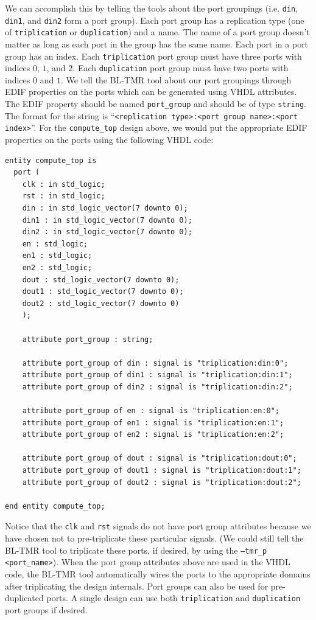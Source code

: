 We can accomplish this by telling the tools about the port groupings (i.e.
\texttt{din}, \texttt{din1}, and \texttt{din2} form a port group). Each port
group has a replication type (one of \texttt{triplication} or
\texttt{duplication}) and a name. The name of a port group doesn't matter as
long as each port in the group has the same name. Each port in a port group has
an index. Each \texttt{triplication} port group must have three ports with
indices $0$, $1$, and $2$. Each \texttt{duplication} port group must have two
ports with indices $0$ and $1$. We tell the BL-TMR tool about our port groupings
through EDIF properties on the ports which can be generated using VHDL
attributes. The EDIF property should be named \texttt{port\_group} and should
be of type \texttt{string}. The format for the string is ``\texttt{<replication
type>:<port group name>:<port index>}''. For the \texttt{compute\_top} design
above, we would put the appropriate EDIF properties on the ports using the
following VHDL code:
\begin{verbatim}
entity compute_top is
  port (
    clk : in std_logic;
    rst : in std_logic;
    din : in std_logic_vector(7 downto 0);
    din1 : in std_logic_vector(7 downto 0);
    din2 : in std_logic_vector(7 downto 0);
    en : std_logic;
    en1 : std_logic;
    en2 : std_logic;
    dout : std_logic_vector(7 downto 0);
    dout1 : std_logic_vector(7 downto 0);
    dout2 : std_logic_vector(7 downto 0)
    );
	
    attribute port_group : string;

    attribute port_group of din : signal is "triplication:din:0";
    attribute port_group of din1 : signal is "triplication:din:1";
    attribute port_group of din2 : signal is "triplication:din:2";

    attribute port_group of en : signal is "triplication:en:0";
    attribute port_group of en1 : signal is "triplication:en:1";
    attribute port_group of en2 : signal is "triplication:en:2";

    attribute port_group of dout : signal is "triplication:dout:0";
    attribute port_group of dout1 : signal is "triplication:dout:1";
    attribute port_group of dout2 : signal is "triplication:dout:2";

end entity compute_top;
\end{verbatim}

Notice that the \texttt{clk} and \texttt{rst} signals do not have port group
attributes because we have chosen not to pre-triplicate these particular
signals. (We could still tell the BL-TMR tool to triplicate these ports, if
desired, by using the \texttt{--tmr\_p <port\_name>}). When the port group attributes
above are used in the VHDL code, the BL-TMR tool automatically wires the ports
to the appropriate domains after triplicating the design internals. Port groups can
also be used for pre-duplicated ports. A single design can use both
\texttt{triplication} and \texttt{duplication} port groups if desired.

